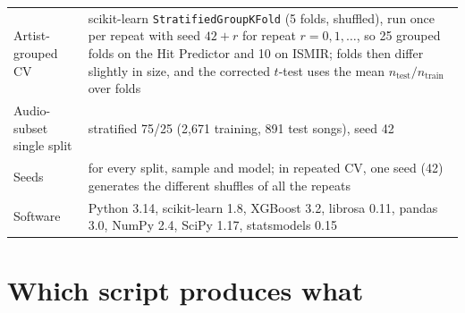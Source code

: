 \begin{table}[!htbp]
\begin{tabular}{@{}>{\raggedright\arraybackslash}p{2.4cm}>{\raggedright\arraybackslash}p{5.6cm}@{}}
Artist-grouped CV & scikit-learn \texttt{StratifiedGroupKFold} (5 folds, shuffled), run once per repeat with seed $42+r$ for repeat $r=0,1,\dots$, so 25 grouped folds on the Hit Predictor and 10 on ISMIR; folds then differ slightly in size, and the corrected $t$-test uses the mean $n_{\text{test}}/n_{\text{train}}$ over folds \\
Audio-subset single split & stratified 75/25 (2{,}671 training, 891 test songs), seed 42 \\
Seeds & 42 for every split, sample and model; in repeated CV, one seed (42) generates the different shuffles of all the repeats \\
Software & Python 3.14, scikit-learn 1.8, XGBoost 3.2, librosa 0.11, pandas 3.0, NumPy 2.4, SciPy 1.17, statsmodels 0.15 \\
\bottomrule
\end{tabular}
\end{table}



\FloatBarrier
\section{Which script produces what}\label{app:scripts}

